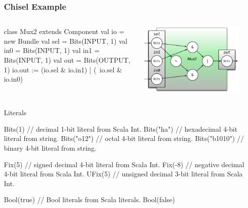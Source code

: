 \documentclass[xcolor=pdflatex,dvipsnames,table]{beamer}
\begin{document}
\begin{frame}[fragile]
\frametitle{Chisel Example}
\begin{columns}


\begin{footnotesize}
\begin{scala}
class Mux2 extends Component {
  val io = new Bundle{
    val sel = Bits(INPUT, 1)
    val in0 = Bits(INPUT, 1)
    val in1 = Bits(INPUT, 1)
    val out = Bits(OUTPUT, 1)
  }
  io.out := (io.sel & io.in1) | 
            (~io.sel & io.in0)
}
\end{scala}
\end{footnotesize}


\begin{center}
\includegraphics[width=0.9\textwidth]{figs/mux2-component.pdf} 
\end{center}

\end{columns}
\end{frame}


\begin{frame}[fragile]{Literals}
\begin{scala}
Bits(1)       // decimal 1-bit literal from Scala Int. 
Bits("ha")    // hexadecimal 4-bit literal from string.
Bits("o12")   // octal 4-bit literal from string. 
Bits("b1010") // binary 4-bit literal from string.

Fix(5)        // signed decimal 4-bit literal from Scala Int.
Fix(-8)       // negative decimal 4-bit literal from Scala Int.
UFix(5)       // unsigned decimal 3-bit literal from Scala Int.

Bool(true)    // Bool literals from Scala literals.
Bool(false)
\end{scala}
\end{frame}
 
\end{document}
